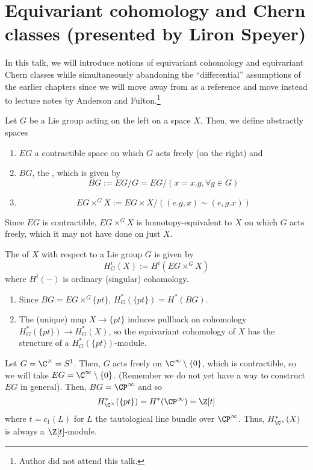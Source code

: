 \documentclass[11pt,leqno,oneside]{amsbook}
\numberwithin{thm}{section}
\begin{document}
\section{Equivariant cohomology and Chern classes (presented by Liron
  Speyer) }
In this talk, we will introduce notions of equivariant cohomology and
equivariant Chern classes while simultaneously abandoning the
``differential'' assumptions of the earlier chapters since we will
move away from \cite{bott-tu} as a reference and move instead to
lecture notes by Anderson and Fulton.\footnote{Author did not attend this talk.}
\begin{defn}
  Let \(G\) be a Lie group acting on the left on a space \(X\). Then,
  we define abstractly spaces
  \begin{enumerate}
  \item \(EG\) a contractible space on which \(G\) acts freely (on the
    right) and
  \item \(BG\), the , which is given by \[
      BG := EG/G = EG/(x = x.g, \forall g \in G)
    \]
  \item \[
      EG \times^G X := EG \times X /((e.g, x) \sim (e,g.x))
    \]
  \end{enumerate}
\end{defn}
Since \(EG\) is contractible, \(EG \times^G X\) is homotopy-equivalent
to \(X\) on which \(G\) acts freely, which it may not have done on
just \(X\).
\begin{defn}
  The  of \(X\) with respect to a Lie group
  \(G\) is given by \[
    H_G^i(X) := H^i(EG \times^G X)
  \]
  where \(H^i(-)\) is ordinary (singular) cohomology. 
\end{defn}
\begin{prop}
  \begin{enumerate}
  \item Since \(BG = EG \times^G \{pt\}\),
    \(H^*_G(\{pt\}) = H^*(BG)\).
  \item The (unique) map \(X \to \{pt\}\) induces pullback on
    cohomology \(H_G^*(\{pt\}) \to H_G^*(X)\), so the equivariant
    cohomology of \(X\) has the structure of a
    \(H_G^*(\{pt\})\)-module. 
  \end{enumerate}
\end{prop}
\begin{example}
  Let \(G = \C^\times = S^1\). Then, \(G\) acts freely on \(\C^\infty
  \setminus \{0\}\), which is contractible, so we will take \(EG =
  \C^\infty \setminus \{0\}\). (Remember we do not yet have a way to
  construct \(EG\) in general). Then, \(BG = \CP^\infty\) and so \[
    H_{\C^\times}^*(\{pt\}) = H^*(\CP^\infty) = \Z[t]
  \]
  where \(t = c_1(L)\) for \(L\) the tautological line bundle over
  \(\CP^\infty\). Thus, \(H_{\C^\times}^*(X)\) is always a
  \(\Z[t]\)-module.
\end{example}
\end{document}
